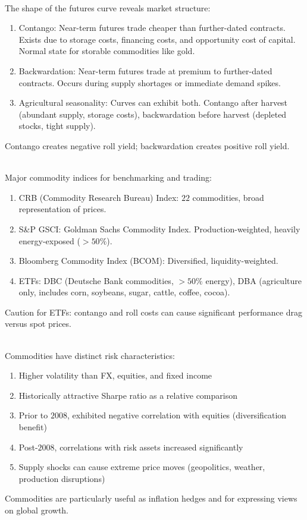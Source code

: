 \documentclass[a4paper,oneside,openany]{book}
\begin{document}
\begin{remark} \\
The shape of the futures curve reveals market structure:
\begin{enumerate}[label=\roman*.]
\setlength{\itemsep}{0pt}
\item Contango: Near-term futures trade cheaper than further-dated contracts. Exists due to storage costs, financing costs, and opportunity cost of capital. Normal state for storable commodities like gold.
\item Backwardation: Near-term futures trade at premium to further-dated contracts. Occurs during supply shortages or immediate demand spikes.
\item Agricultural seasonality: Curves can exhibit both. Contango after harvest (abundant supply, storage costs), backwardation before harvest (depleted stocks, tight supply).
\end{enumerate}
Contango creates negative roll yield; backwardation creates positive roll yield.
\end{remark}

\begin{remark} \\
Major commodity indices for benchmarking and trading:
\begin{enumerate}[label=\roman*.]
\setlength{\itemsep}{0pt}
\item CRB (Commodity Research Bureau) Index: $22$ commodities, broad representation of prices.
\item S\&P GSCI: Goldman Sachs Commodity Index. Production-weighted, heavily energy-exposed ($>50\%$).
\item Bloomberg Commodity Index (BCOM): Diversified, liquidity-weighted.
\item ETFs: DBC (Deutsche Bank commodities, $>50\%$ energy), DBA (agriculture only, includes corn, soybeans, sugar, cattle, coffee, cocoa).
\end{enumerate}
Caution for ETFs: contango and roll costs can cause significant performance drag versus spot prices.
\end{remark}

\begin{remark} \\
Commodities have distinct risk characteristics:
\begin{enumerate}[label=\roman*.]
\setlength{\itemsep}{0pt}
\item Higher volatility than FX, equities, and fixed income
\item Historically attractive Sharpe ratio as a relative comparison
\item Prior to $2008$, exhibited negative correlation with equities (diversification benefit)
\item Post-$2008$, correlations with risk assets increased significantly
\item Supply shocks can cause extreme price moves (geopolitics, weather, production disruptions)
\end{enumerate}
Commodities are particularly useful as inflation hedges and for expressing views on global growth.
\end{remark}
\end{document}
